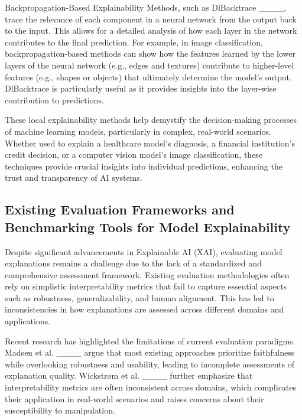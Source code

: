 Backpropagation-Based Explainability Methods, such as DlBacktrace ____, trace the relevance of each component in a neural network from the output back to the input. This allows for a detailed analysis of how each layer in the network contributes to the final prediction. For example, in image classification, backpropagation-based methods can show how the features learned by the lower layers of the neural network (e.g., edges and textures) contribute to higher-level features (e.g., shapes or objects) that ultimately determine the model’s output. DlBacktrace is particularly useful as it provides insights into the layer-wise contribution to predictions.

These local explainability methods help demystify the decision-making processes of machine learning models, particularly in complex, real-world scenarios. Whether used to explain a healthcare model's diagnosis, a financial institution's credit decision, or a computer vision model's image classification, these techniques provide crucial insights into individual predictions, enhancing the trust and transparency of AI systems.

\subsection{Existing Evaluation Frameworks and Benchmarking Tools for Model Explainability}
Despite significant advancements in Explainable AI (XAI), evaluating model explanations remains a challenge due to the lack of a standardized and comprehensive assessment framework. Existing evaluation methodologies often rely on simplistic interpretability metrics that fail to capture essential aspects such as robustness, generalizability, and human alignment. This has led to inconsistencies in how explanations are assessed across different domains and applications.  

Recent research has highlighted the limitations of current evaluation paradigms. Madsen et al. ____ argue that most existing approaches prioritize faithfulness while overlooking robustness and usability, leading to incomplete assessments of explanation quality. Wickstrøm et al. ____ further emphasize that interpretability metrics are often inconsistent across domains, which complicates their application in real-world scenarios and raises concerns about their susceptibility to manipulation.  


